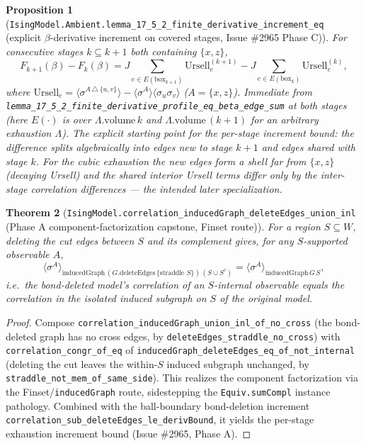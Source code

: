 \documentclass[a4paper,11pt]{article}
\newtheorem{theorem}{Theorem}
\newtheorem{proposition}[theorem]{Proposition}
\begin{document}
\begin{proposition}[\texttt{IsingModel.Ambient.lemma\_17\_5\_2\_finite\_derivative\_increment\_eq}
(explicit $\beta$-derivative increment on covered stages, Issue \#2965 Phase C)]
For consecutive stages $k\subseteq k+1$ both containing $\{x,z\}$,
\[
  F_{k+1}(\beta)-F_k(\beta)
    = J\!\!\sum_{e\in E(\mathrm{box}_{k+1})}\!\!\mathrm{Ursell}^{(k+1)}_e
      - J\!\!\sum_{e\in E(\mathrm{box}_k)}\!\!\mathrm{Ursell}^{(k)}_e,
\]
where $\mathrm{Ursell}_e=\langle\sigma^{A\,\triangle\,\{u,v\}}\rangle
-\langle\sigma^A\rangle\langle\sigma_u\sigma_v\rangle$ ($A=\{x,z\}$). Immediate from
\texttt{lemma\_17\_5\_2\_finite\_derivative\_profile\_eq\_beta\_edge\_sum} at both
stages (here $E(\cdot)$ is over $\Lambda.\mathrm{volume}\,k$ and
$\Lambda.\mathrm{volume}\,(k+1)$ for an arbitrary exhaustion $\Lambda$). The
explicit starting point for the per-stage increment bound: the difference splits
algebraically into edges new to stage $k+1$ and edges shared with stage $k$. For
the cubic exhaustion the new edges form a shell far from $\{x,z\}$ (decaying Ursell)
and the shared interior Ursell terms differ only by the inter-stage correlation
differences — the intended later specialization.
\end{proposition}

\begin{theorem}[\texttt{IsingModel.correlation\_inducedGraph\_deleteEdges\_union\_inl}
(Phase A component-factorization capstone, Finset route)]
For a region $S\subseteq W$, deleting the cut edges between $S$ and its complement
gives, for any $S$-supported observable $A$,
\[
  \langle\sigma^{A}\rangle_{\mathrm{inducedGraph}\,(G.\mathrm{deleteEdges}\,\{\text{straddle }S\})\,(S\cup S^{c})}
    = \langle\sigma^{A}\rangle_{\mathrm{inducedGraph}\,G\,S},
\]
i.e.\ the bond-deleted model's correlation of an $S$-internal observable equals
the correlation in the isolated induced subgraph on $S$ of the \emph{original}
model.
\end{theorem}

\begin{proof}
Compose \texttt{correlation\_inducedGraph\_union\_inl\_of\_no\_cross} (the
bond-deleted graph has no cross edges, by \texttt{deleteEdges\_straddle\_no\_cross})
with \texttt{correlation\_congr\_of\_eq} of
\texttt{inducedGraph\_deleteEdges\_eq\_of\_not\_internal} (deleting the cut leaves
the within-$S$ induced subgraph unchanged, by
\texttt{straddle\_not\_mem\_of\_same\_side}). This realizes the component
factorization via the Finset/\texttt{inducedGraph} route, sidestepping the
\texttt{Equiv.sumCompl} instance pathology. Combined with the ball-boundary
bond-deletion increment \texttt{correlation\_sub\_deleteEdges\_le\_derivBound}, it
yields the per-stage exhaustion increment bound (Issue \#2965, Phase A).
\end{proof}
\end{document}
